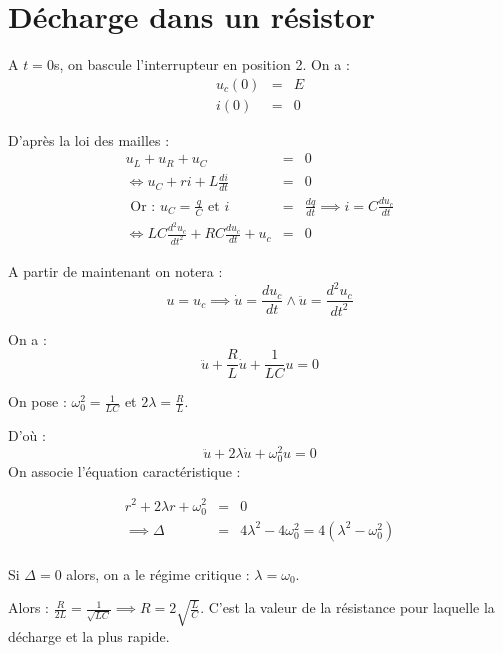 \section{Décharge dans un résistor}
A \(t  =0\)s, on bascule l'interrupteur en position 2. On a : 
\begin{eqnarray*}
    u_{c}(0) &=& E \\
    i(0) &=& 0
\end{eqnarray*}

D'après la loi des mailles : 
\begin{eqnarray*}
    u_{L} + u_{R} + u_{C} &=& 0 \\
    \iff u_{C} + ri + L \frac{di}{dt} &=& 0 \\
    \text{ Or :  } u_{C} = \frac{q}{C} \text{ et } i &=& \frac{dq}{dt} \implies  i = C \frac{du_{c}}{dt} \\
    \iff LC \frac{d^{2}u_{c}}{dt^{2}} + RC \frac{du_{c}}{dt} + u_{c} &=& 0
\end{eqnarray*}

\begin{notation}
    A partir de maintenant on notera : 
    \[
        u = u_{c} \implies \dot{u} = \frac{du_{c}}{dt} \wedge \ddot{u} = \frac{d^{2}u_{c}}{dt^{2}}
    \]
\end{notation}

On a : 
\[
    \ddot{u} + \frac{R}{L}\dot{u} + \frac{1}{LC}u = 0
\]

\begin{notation}
    On pose : \(\omega_{\text{0}}^{2} = \frac{1}{LC}\) et \(2\lambda  = \frac{R}{L}\).   
\end{notation}
D'où : 
\[
    \ddot{u} + 2\lambda \dot{u} + \omega_{\text{0}}^{2} u = 0
\]
On associe l'équation caractéristique : 

\begin{eqnarray*}
    r^{2} + 2\lambda r + \omega_{\text{0}}^{2} &=& 0 \\
    \implies \Delta &=& 4\lambda^{2} -4\omega_{\text{0}}^{2} = 4(\lambda^{2} - \omega_{\text{0}}^{2}) \\
\end{eqnarray*}

\begin{remark}
    Si \(\Delta = 0\) alors, on a le régime critique : \(\lambda = \omega_{\text{0}}\). \par
    Alors : \(\frac{R}{2L} = \frac{1}{\sqrt{LC}} \implies R = 2\sqrt{\frac{L}{C}}\). C'est la valeur de la résistance pour laquelle la décharge et la plus rapide.   

\end{remark}

